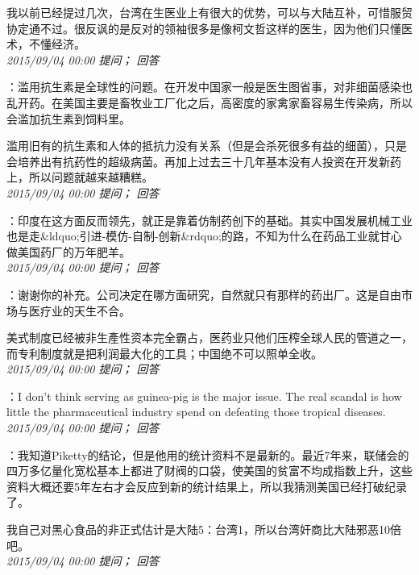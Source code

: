 \documentclass[twocolumn]{ctexart}
\begin{document}
我以前已经提过几次，台湾在生医业上有很大的优势，可以与大陆互补，可惜服贸协定通不过。很反讽的是反对的领袖很多是像柯文哲这样的医生，因为他们只懂医术，不懂经济。\\

\textit{\hfill\noindent\small 2015/09/04 00:00 提问； 回答}

：滥用抗生素是全球性的问题。在开发中国家一般是医生图省事，对非细菌感染也乱开药。在美国主要是畜牧业工厂化之后，高密度的家禽家畜容易生传染病，所以会滥加抗生素到饲料里。

滥用旧有的抗生素和人体的抵抗力没有关系（但是会杀死很多有益的细菌），只是会培养出有抗药性的超级病菌。再加上过去三十几年基本没有人投资在开发新药上，所以问题就越来越糟糕。\\

\textit{\hfill\noindent\small 2015/09/04 00:00 提问； 回答}

：印度在这方面反而领先，就正是靠着仿制药创下的基础。其实中国发展机械工业也是走\&ldquo;引进-模仿-自制-创新\&rdquo;的路，不知为什么在药品工业就甘心做美国药厂的万年肥羊。\\

\textit{\hfill\noindent\small 2015/09/04 00:00 提问； 回答}

：谢谢你的补充。公司决定在哪方面研究，自然就只有那样的药出厂。这是自由市场与医疗业的天生不合。

美式制度已经被非生產性资本完全霸占，医药业只他们压榨全球人民的管道之一，而专利制度就是把利润最大化的工具；中国绝不可以照单全收。\\

\textit{\hfill\noindent\small 2015/09/04 00:00 提问； 回答}

：I don't think serving as guinea-pig is the major issue. The real scandal is how little the pharmaceutical industry spend on defeating those tropical diseases.\\

\textit{\hfill\noindent\small 2015/09/04 00:00 提问； 回答}

：我知道Piketty的结论，但是他用的统计资料不是最新的。最近7年来，联储会的四万多亿量化宽松基本上都进了财阀的口袋，使美国的贫富不均成指数上升，这些资料大概还要5年左右才会反应到新的统计结果上，所以我猜测美国已经打破纪录了。

我自己对黑心食品的非正式估计是大陆5：台湾1，所以台湾奸商比大陆邪恶10倍吧。\\

\textit{\hfill\noindent\small 2015/09/04 00:00 提问； 回答}
\end{document}
